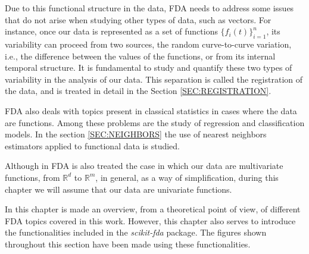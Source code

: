 Due to this functional structure in the data,
FDA needs to address some issues that do not arise when studying other types of
data, such as vectors.
For instance, once our data is represented as a set of functions
$\{f_i(t)\}_{i=1}^{n}$, its variability can proceed from two sources,
the random curve-to-curve variation, i.e., the difference between the values of
the functions, or from its internal temporal structure.
It is fundamental to study and quantify these two types of variability in
the analysis of our data. This separation is called the registration of the data,
and is treated in detail in the Section \ref{SEC:REGISTRATION}.

FDA also deals with topics present in classical statistics in cases where the
data are functions. Among these problems are the study of regression and
classification models. In the section \ref{SEC:NEIGHBORS} the use of nearest
neighbors estimators applied to functional data is studied.

Although in FDA is also treated the case in which our data are multivariate
functions, from  $\mathbb{R}^d$ to $\mathbb{R}^m$, in general, as a way of
simplification, during this chapter we will assume that our data are
univariate functions.

In this chapter is made an overview, from a theoretical point of view, of
different FDA topics covered in this work. However, this chapter also serves
to introduce the functionalities included in the \textit{scikit-fda} package.
The figures shown throughout this section have been made using these functionalities.
